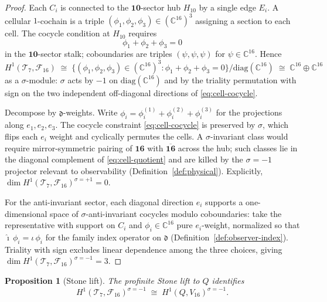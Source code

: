\documentclass[aps,prd,onecolumn,amsmath,amssymb,nofootinbib,11pt]{revtex4-2}
\numberwithin{equation}{section}
\theoremstyle{plain}
\newtheorem{proposition}[theorem]{Proposition}
\theoremstyle{definition}
\theoremstyle{remark}
\newcommand{\C}{\mathbb{C}}
\begin{document}
\begin{proof}
Each $C_i$ is connected to the $\mathbf{10}$-sector hub $H_{10}$ by a single
edge $E_i$. A cellular $1$-cochain is a triple
$(\phi_1,\phi_2,\phi_3)\in(\C^{16})^3$ assigning a section to each cell. The
cocycle condition at $H_{10}$ requires
\begin{equation}\label{eq:cell-cocycle}
  \phi_1+\phi_2+\phi_3=0
\end{equation}
in the $\mathbf{10}$-sector stalk; coboundaries are triples
$(\psi,\psi,\psi)$ for $\psi\in\C^{16}$. Hence
\begin{equation}\label{eq:cell-quotient}
  H^1(\mathcal{T}_7,\mathcal{F}_{16})
  \;\cong\;
  \bigl\{(\phi_1,\phi_2,\phi_3)\in(\C^{16})^3:\phi_1+\phi_2+\phi_3=0\bigr\}
  \big/\mathrm{diag}(\C^{16})
  \;\cong\;
  \C^{16}\oplus\C^{16}
\end{equation}
as a $\sigma$-module: $\sigma$ acts by $-1$ on $\mathrm{diag}(\C^{16})$ and
by the triality permutation with sign on the two independent off-diagonal
directions of \eqref{eq:cell-cocycle}.

Decompose by $\mathfrak{d}$-weights. Write
$\phi_i=\phi_i^{(1)}+\phi_i^{(2)}+\phi_i^{(3)}$ for the projections along
$e_1,e_2,e_3$. The cocycle constraint \eqref{eq:cell-cocycle} is preserved by
$\sigma$, which flips each $e_i$ weight and cyclically permutes the cells.
A $\sigma$-invariant class would require mirror-symmetric pairing of
$\mathbf{16}$ with $\overline{\mathbf{16}}$ across the hub; such classes lie in
the diagonal complement of \eqref{eq:cell-quotient} and are killed by the
$\sigma=-1$ projector relevant to observability
(Definition~\ref{def:physical}). Explicitly,
$\dim H^1(\mathcal{T}_7,\mathcal{F}_{16})^{\sigma=+1}=0$.

For the anti-invariant sector, each diagonal direction $e_i$ supports a
one-dimensional space of $\sigma$-anti-invariant cocycles modulo
coboundaries: take the representative with support on $C_i$ and
$\phi_i\in\C^{16}$ pure $e_i$-weight, normalized so that
$\hat{\imath}\,\phi_i=\iota\,\phi_i$ for the family index operator on
$\mathfrak{d}$ (Definition~\ref{def:observer-index}). Triality with sign
excludes linear dependence among the three choices, giving
$\dim H^1(\mathcal{T}_7,\mathcal{F}_{16})^{\sigma=-1}=3$.
\end{proof}

\begin{proposition}[Stone lift]\label{prop:stone-lift}
The profinite Stone lift to $Q$ identifies
\begin{equation}\label{eq:stone-lift}
  H^1(\mathcal{T}_7,\mathcal{F}_{16})^{\sigma=-1}
  \;\cong\;
  H^1(Q,V_{16})^{\sigma=-1}.
\end{equation}
\end{proposition}
\end{document}
